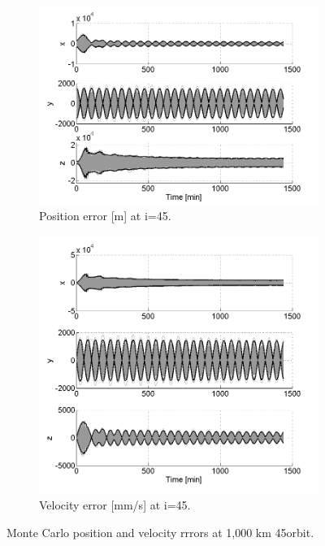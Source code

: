 \documentclass[]{aiaa-tc}%
\begin{document}
%
\begin{figure}[h!]
\centering
\begin{subfigure}{.49\textwidth}
  \centering
  \includegraphics{MC_pos45}
  \caption{Position error [m] at i=45\degree.}
  \label{fig:mcpos45}
\end{subfigure}%
\begin{subfigure}{.49\textwidth} 
  \centering
  \includegraphics{MC_vel45}
  \caption{Velocity error [mm/s] at i=45\degree.}
  \label{fig:coastline}
\end{subfigure}
\caption{Monte Carlo position and velocity rrrors at 1,000 km 45\degree orbit.}
\label{fig:mcvel45}
\end{figure}
\end{document}
